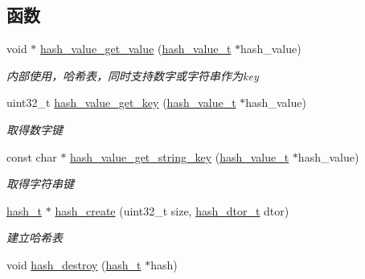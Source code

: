 \subsection*{函数}
\begin{DoxyCompactItemize}
\item 
void $\ast$ \hyperlink{a00062_ad0be61da4760c7d8dedbe56a81a688bb_ad0be61da4760c7d8dedbe56a81a688bb}{hash\+\_\+value\+\_\+get\+\_\+value} (\hyperlink{a00050_af7ecd66aeef0ce1b0495e5f65e77733e_af7ecd66aeef0ce1b0495e5f65e77733e}{hash\+\_\+value\+\_\+t} $\ast$hash\+\_\+value)
\begin{DoxyCompactList}\small\item\em 内部使用，哈希表，同时支持数字或字符串作为key \end{DoxyCompactList}\item 
uint32\+\_\+t \hyperlink{a00062_ab631c6680928561445077645be20aa76_ab631c6680928561445077645be20aa76}{hash\+\_\+value\+\_\+get\+\_\+key} (\hyperlink{a00050_af7ecd66aeef0ce1b0495e5f65e77733e_af7ecd66aeef0ce1b0495e5f65e77733e}{hash\+\_\+value\+\_\+t} $\ast$hash\+\_\+value)
\begin{DoxyCompactList}\small\item\em 取得数字键 \end{DoxyCompactList}\item 
const char $\ast$ \hyperlink{a00062_ac50440f30c8359bbcf04c00297910b7f_ac50440f30c8359bbcf04c00297910b7f}{hash\+\_\+value\+\_\+get\+\_\+string\+\_\+key} (\hyperlink{a00050_af7ecd66aeef0ce1b0495e5f65e77733e_af7ecd66aeef0ce1b0495e5f65e77733e}{hash\+\_\+value\+\_\+t} $\ast$hash\+\_\+value)
\begin{DoxyCompactList}\small\item\em 取得字符串键 \end{DoxyCompactList}\item 
\hyperlink{a00050_a188677c3015513590ab998e96b999966_a188677c3015513590ab998e96b999966}{hash\+\_\+t} $\ast$ \hyperlink{a00062_accead380199ce99795d29e9d178e849b_accead380199ce99795d29e9d178e849b}{hash\+\_\+create} (uint32\+\_\+t size, \hyperlink{a00050_a5dcd1ed9242185e4448352748e58573d_a5dcd1ed9242185e4448352748e58573d}{hash\+\_\+dtor\+\_\+t} dtor)
\begin{DoxyCompactList}\small\item\em 建立哈希表 \end{DoxyCompactList}\item 
void \hyperlink{a00062_a4073889d36e8fb6d2b2fcdea9d890db9_a4073889d36e8fb6d2b2fcdea9d890db9}{hash\+\_\+destroy} (\hyperlink{a00050_a188677c3015513590ab998e96b999966_a188677c3015513590ab998e96b999966}{hash\+\_\+t} $\ast$hash)

\end{DoxyCompactItemize}
